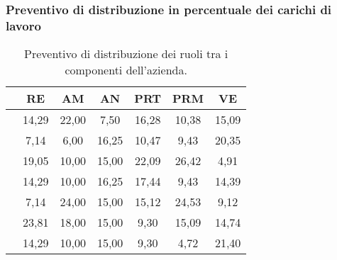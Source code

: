 \subsubsection{Preventivo di distribuzione in percentuale dei carichi di lavoro}{
		\begin{table}[h!]
		\begin{center}
			\begin{tabular}{l c c c c c c}				
				\toprule
				&	RE& AM& AN& PRT& PRM& VE \\ 
				\midrule
				\BM	&	14,29	&	22,00	&	7,50 	&	16,28	&	10,38	&	15,09\\ 
				\BA	&	7,14 	&	6,00 	&	16,25	&	10,47	&	9,43 	&	20,35\\
				\CD	&	19,05	&	10,00	&	15,00	&	22,09	&	26,42	&	4,91\\ 
				\LS	&	14,29	&	10,00	&	16,25	&	17,44	&	9,43 	&	14,39\\
				\PV &	7,14 	&	24,00	&	15,00	&	15,12	&	24,53	&	9,12\\
				\ZF 	&	23,81	&	18,00	&	15,00	&	9,30 	&	15,09	&	14,74\\
				\ZE &	14,29	&	10,00	&	15,00	&	9,30 	&	4,72 	&	21,40\\
				\bottomrule
			\end{tabular}
		\end{center}	
		\caption{Preventivo di distribuzione dei ruoli tra i componenti dell’azienda.}
	\end{table}	
	
}
